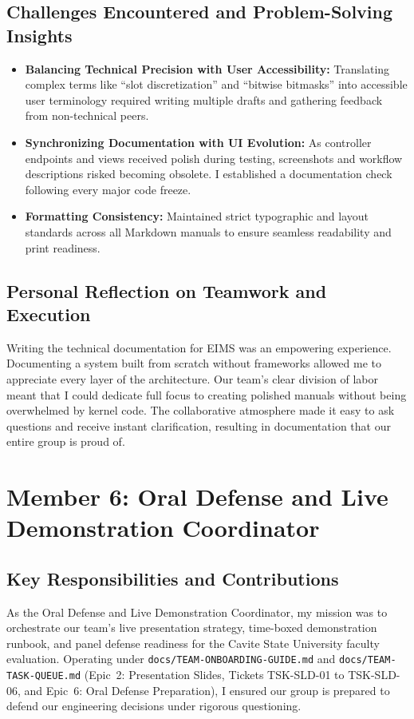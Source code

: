 \subsection{Challenges Encountered and Problem-Solving Insights}
\begin{itemize}
    \item \textbf{Balancing Technical Precision with User Accessibility:} Translating complex terms like ``slot discretization'' and ``bitwise bitmasks'' into accessible user terminology required writing multiple drafts and gathering feedback from non-technical peers.
    \item \textbf{Synchronizing Documentation with UI Evolution:} As controller endpoints and views received polish during testing, screenshots and workflow descriptions risked becoming obsolete. I established a documentation check following every major code freeze.
    \item \textbf{Formatting Consistency:} Maintained strict typographic and layout standards across all Markdown manuals to ensure seamless readability and print readiness.
\end{itemize}

\subsection{Personal Reflection on Teamwork and Execution}
Writing the technical documentation for EIMS was an empowering experience. Documenting a system built from scratch without frameworks allowed me to appreciate every layer of the architecture. Our team's clear division of labor meant that I could dedicate full focus to creating polished manuals without being overwhelmed by kernel code. The collaborative atmosphere made it easy to ask questions and receive instant clarification, resulting in documentation that our entire group is proud of.

\newpage
\section{Member 6: Oral Defense and Live Demonstration Coordinator}
\label{sec:reflection_member_6}

\subsection{Key Responsibilities and Contributions}
As the Oral Defense and Live Demonstration Coordinator, my mission was to orchestrate our team's live presentation strategy, time-boxed demonstration runbook, and panel defense readiness for the Cavite State University faculty evaluation. Operating under \texttt{docs/TEAM-ONBOARDING-GUIDE.md} and \texttt{docs/TEAM-TASK-QUEUE.md} (Epic~2: Presentation Slides, Tickets TSK-SLD-01 to TSK-SLD-06, and Epic~6: Oral Defense Preparation), I ensured our group is prepared to defend our engineering decisions under rigorous questioning.

